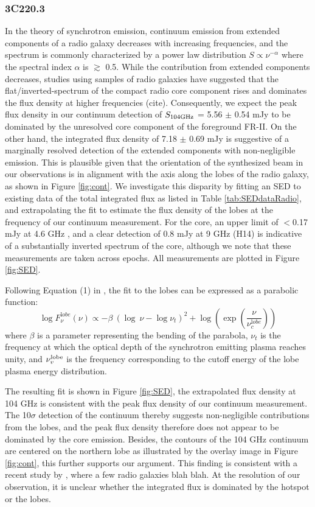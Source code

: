 \documentclass[twocolumn,apj,numberedappendix]{emulateapj}
\begin{document}
\subsubsection{3C220.3}
In the theory of synchrotron emission, continuum emission from extended components of a radio galaxy decreases with increasing frequencies, and the spectrum is commonly characterized by a power law distribution $S \propto \nu^{-\alpha}$ where the spectral index $\alpha$ is $\gtrsim$ 0.5. While the contribution from extended components decreases, studies using samples of radio galaxies have suggested that the flat/inverted-spectrum of the compact radio core component rises and dominates the flux density at higher frequencies (cite). Consequently, we expect the peak flux density in our continuum detection of $S_{\rm 104GHz}$ = 5.56 $\pm$ 0.54 mJy to be dominated by the unresolved core component of the foreground FR-II. On the other hand, the integrated flux density of 7.18 $\pm$ 0.69 mJy is suggestive of a marginally resolved detection of the extended components with non-negligible emission. This is plausible given that the orientation of the synthesized beam in our observations is in alignment with the axis along the 
lobes of the radio galaxy, as shown in Figure \ref{fig:cont}. We investigate this disparity by fitting an SED to existing data of the total integrated flux as listed in Table \ref{tab:SEDdataRadio}, and extrapolating the fit to estimate the flux density of the lobes at the frequency of our continuum measurement. For the core, an upper limit of $<$0.17 mJy at 4.6 GHz \citep{Mullin06a}, and a clear detection of 0.8 mJy at 9 GHz (H14) is indicative of a substantially inverted spectrum of the core, although we note that these measurements are taken across epochs. All measurements are plotted in Figure \ref{fig:SED}. 

Following Equation (1) in \citet{Cleary07a}, the fit to the lobes can be expressed as a parabolic function:
\begin{equation}
\log F_{\nu}^{\mathrm lobe} (\nu) \propto - \beta\ (\log\ \nu - \log \nu_{t})^2  + \log (\exp({\frac{\nu}{\nu_c^{\mathrm lobe}}}))
\end{equation}
where $\beta$ is a parameter representing the bending of the parabola, $\nu_t$ is the frequency at which the optical depth of the synchrotron emitting plasma reaches unity, and $\nu_v^{\rm lobe}$ is the frequency corresponding to the cutoff energy of the lobe plasma energy distribution. 

The resulting fit is shown in Figure \ref{fig:SED}, the extrapolated flux density at 104 GHz is consistent with the peak flux density of our continuum measurement. The 10$\sigma$ detection of the continuum thereby suggests
non-negligible contributions from the lobes, and the peak flux density therefore does not appear to be dominated by the core 
emission. Besides, the contours of the 104 GHz continuum are
centered on the northern lobe as illustrated by the overlay image in Figure \ref{fig:cont}, this further supports our argument. This finding is consistent with a recent study by \citet{Hardcastle08a}, where a few radio galaxies blah blah. At the resolution of our observation, it is unclear whether the integrated flux is dominated by the hotspot or the lobes. 
\end{document}
